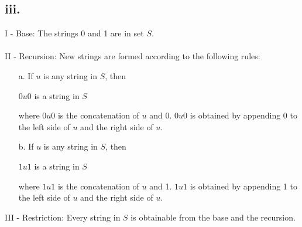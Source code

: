 \documentclass[12pt]{article}
\begin{document}
\subsection*{iii.}
I - Base: The strings 0 and 1 are in set $S$.
\\ \\
II - Recursion: New strings are formed according to the following rules:
\begin{itemize}
    \item [a.] If $u$ is any string in $S$, then
    \begin{center}
        $0u0$ is a string in $S$\\
    \end{center}
    where $0u0$ is the concatenation of $u$ and 0. $0u0$ is obtained by appending 0 to the left side of $u$ and the right side of $u$.
    \item [b.] If $u$ is any string in $S$, then
    \begin{center}
        $1u1$ is a string in $S$\\
    \end{center}
    where $1u1$ is the concatenation of $u$ and 1. $1u1$ is obtained by appending 1 to the left side of $u$ and the right side of $u$.
\end{itemize}
III - Restriction: Every string in $S$ is obtainable from the base and the recursion.
\end{document}
